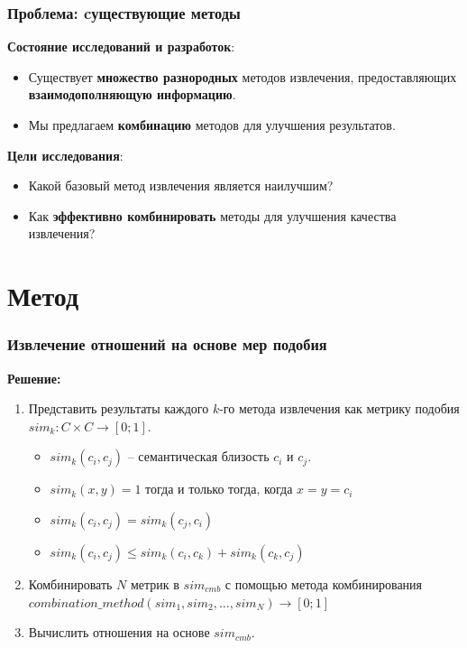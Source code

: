 \documentclass{beamer}
\begin{document}
\begin{frame}
\frametitle{Проблема: cуществующие методы}
\textbf{Состояние исследований и разработок}: 
\begin{itemize}
\item Существует \textbf{множество разнородных} методов извлечения, предоставляющих \textbf{взаимодополняющую информацию}.
\item Мы предлагаем \textbf{комбинацию} методов для улучшения результатов.
\end{itemize}


\textbf{Цели исследования}: 
\begin{itemize}
\item Какой базовый метод извлечения является наилучшим?
\item Как \textbf{эффективно комбинировать} методы для улучшения качества извлечения?
\end{itemize}
\end{frame}


\section{Метод}

\begin{frame}
\frametitle{Извлечение отношений на основе мер подобия}

\textbf{Решение:}
\begin{enumerate}
\item Представить результаты каждого $k$-го метода извлечения как метрику подобия $sim_k:C \times C \rightarrow [0;1]$.
\begin{itemize}
   
  \item $sim_k(c_i,c_j)$ -- семантическая близость $c_i$ и $c_j$. 
  \item $sim_k(x,y) = 1 \text{ тогда и только тогда, когда } x=y=c_i$
  \item $sim_k(c_i,c_j) = sim_k(c_j,c_i)$
  \item $sim_k(c_i,c_j) \leq sim_k(c_i,c_k) + sim_k(c_k,c_j)$
\end{itemize}
\item Комбинировать $N$ метрик в $sim_{cmb}$ с помощью метода комбинирования $combination\_method(sim_1, sim_2,\ldots,sim_N) \rightarrow [0;1]$
\item Вычислить отношения на основе $sim_{cmb}$.
\end{enumerate}

\end{frame}
\end{document}
